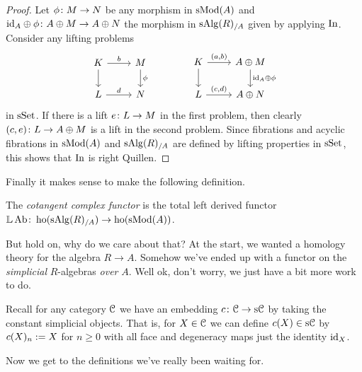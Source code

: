 \begin{proof}
  Let $\phi \colon M \to N$ be any morphism in $\mathrm{s}\mathrm{Mod}(A)$ and $\mathrm{id}_A
  \oplus \phi\colon A \oplus M \to A \oplus N$ the morphism in
  $\mathrm{s}\mathrm{Alg}(R)_{/A}$ given by applying $\operatorname{In}$. Consider any lifting
  problems
  \[
  \begin{tikzcd}
    K \rar{b} \dar & M \dar{\phi} \\ L \rar{d} & N
  \end{tikzcd}
  \hspace{40pt}
  \begin{tikzcd}
    K \rar{(a,b)} \dar & A \oplus M \dar{\id_A \oplus \phi} \\ L
    \rar{(c,d)} & A \oplus N
  \end{tikzcd}
  \]
  in $\mathrm{s}\mathrm{Set}$. If there is a lift $e \colon L \to M$ in the first problem,
  then clearly $(c,e) \colon L \to A \oplus M$ is a lift in the second
  problem. Since fibrations and acyclic fibrations in $\mathrm{s}\mathrm{Mod}(A)$ and
  $\mathrm{s}\mathrm{Alg}(R)_{/A}$ are defined by lifting properties in $\mathrm{s}\mathrm{Set}$, this
  shows that $\operatorname{In}$ is right Quillen.
\end{proof}

Finally it makes sense to make the following definition.

\newcommand{\Cot}{\mathrm{L}}

\begin{definition}
  The \emph{cotangent complex functor} is the total left derived
  functor $\mathbb{L}\operatorname{Ab} \colon \operatorname{ho}(\mathrm{s}\mathrm{Alg}(R)_{/A}) \to \operatorname{ho}(\mathrm{s}\mathrm{Mod}(A))$.
\end{definition}

But hold on, why do we care about that? At the start, we wanted a
homology theory for the algebra $R \to A$. Somehow we've ended up with
a functor on the \emph{simplicial} $R$-algebras \emph{over} $A$. Well
ok, don't worry, we just have a bit more work to do.

\begin{nothing}
  \label{constant}
  Recall for any category $\mathcal{C}$ we have an embedding $c \colon \mathcal{C} \to \mathrm{s}\mathcal{C}$
  by taking the constant simplicial objects. That is, for $X \in \mathcal{C}$
  we can define $c(X) \in \mathrm{s}\mathcal{C}$ by $c(X)_n \mathrel{:=} X$ for $n \ge 0$
  with all face and degeneracy maps just the identity $\mathrm{id}_X$.
\end{nothing}

Now we get to the definitions we've really been waiting for.

\renewcommand{\D}{\mathrm{D}}

